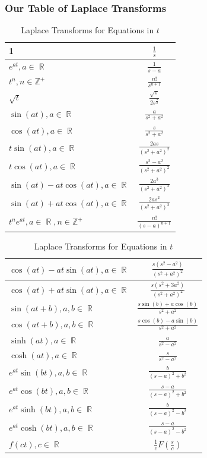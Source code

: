 \documentclass[a4paper,twoside,10pt]{article}
\DeclareMathOperator\R{\mathbb{R}}
\begin{document}
		\subsubsection{Our Table of Laplace Transforms}
			\bgroup
			\everymath{\displaystyle}
			\def\arraystretch{2.5}
			\begin{table}[H]
				\footnotesize
				\begin{tabular}[t]{|p{5cm}|c|}
					\hline
					1&$\frac{1}{s}$\\\hline
					$e^{at},a\in\R$&$\frac{1}{s-a}$\\\hline
					$t^n,n\in\mathbb{Z}^+$&$\frac{n!}{s^{n+1}}$\\\hline
					$\sqrt{t}$&$\frac{\sqrt{\pi}}{2s^{\frac{3}{2}}}$\\\hline
					$\sin(at),a\in\R$&$\frac{a}{s^2+a^2}$\\\hline
					$\cos(at),a\in\R$&$\frac{s}{s^2+a^2}$\\\hline
					$t\sin(at),a\in\R$&$\frac{2as}{(s^2+a^2)^2}$\\\hline
					$t\cos(at),a\in\R$&$\frac{s^2-a^2}{(s^2+a^2)^2}$\\\hline
					$\sin(at)-at\cos(at),a\in\R$&$\frac{2a^3}{(s^2+a^2)^2}$\\\hline
					$\sin(at)+at\cos(at),a\in\R$&$\frac{2as^2}{(s^2+a^2)^2}$\\\hline
					$t^ne^{at},a\in\R,n\in\mathbb{Z}^+$&$\frac{n!}{(s-a)^{n+1}}$\\\hline
				\end{tabular}
				\hfill
				\begin{tabular}[t]{|p{5cm}|c|}
					\hline
					$\cos(at)-at\sin(at),a\in\R$&$\frac{s(s^2-a^2)}{(s^2+a^2)^2}$\\\hline
					$\cos(at)+at\sin(at),a\in\R$&$\frac{s(s^2+3a^2)}{(s^2+a^2)^2}$ \\\hline
					$\sin(at+b),a,b\in\R$&$\frac{s\sin(b)+a\cos(b)}{s^2+a^2}$\\\hline
					$\cos(at+b),a,b\in\R$&$\frac{s\cos(b)-a\sin(b)}{s^2+a^2}$ \\\hline   
					$\sinh(at),a\in\R$&$\frac{a}{s^2-a^2}$\\\hline
					$\cosh(at),a\in\R$&$\frac{s}{s^2-a^2}$\\\hline
					$e^{at}\sin(bt),a,b\in\R$&$\frac{b}{(s-a)^2+b^2}$\\\hline
					$e^{at}\cos(bt),a,b\in\R$&$\frac{s-a}{(s-a)^2+b^2}$\\\hline
					$e^{at}\sinh(bt),a,b\in\R$&$\frac{b}{(s-a)^2-b^2}$\\\hline
					$e^{at}\cosh(bt),a,b\in\R$&$\frac{s-a}{(s-a)^2-b^2}$\\\hline
					$f(ct),c\in\R$&$\frac{1}{c}F(\frac{s}{c})$\\\hline
				\end{tabular}
				\caption{Laplace Transforms for Equations in $t$}
			\end{table}
			\everymath{}
			\egroup
\end{document}
